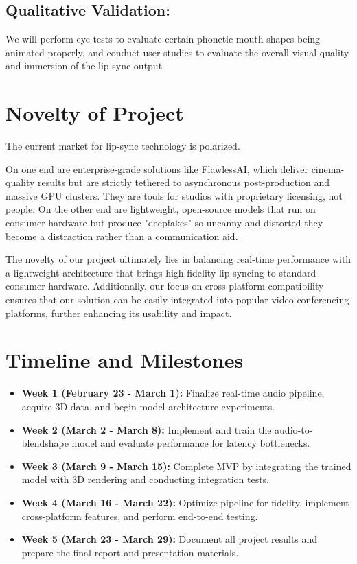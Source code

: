 \subsection{Qualitative Validation:} We will perform eye tests to evaluate certain phonetic mouth shapes being animated properly, and conduct user studies to evaluate the overall visual quality and immersion of the lip-sync output. 

\section{Novelty of Project}

The current market for lip-sync technology is polarized. 

On one end are enterprise-grade solutions like FlawlessAI, which deliver cinema-quality results but are strictly tethered to asynchronous post-production and massive GPU clusters. They are tools for studios with proprietary licensing, not people. On the other end are lightweight, open-source models that run on consumer hardware but produce "deepfakes" so uncanny and distorted they become a distraction rather than a communication aid.

The novelty of our project ultimately lies in balancing real-time performance with a lightweight architecture that brings high-fidelity lip-syncing to standard consumer hardware. Additionally, our focus on cross-platform compatibility ensures that our solution can be easily integrated into popular video conferencing platforms, further enhancing its usability and impact.

\section{Timeline and Milestones}

\begin{itemize}
    \item \textbf{Week 1 (February 23 - March 1):} Finalize real-time audio pipeline, acquire 3D data, and begin model architecture experiments.
    \item \textbf{Week 2 (March 2 - March 8):} Implement and train the audio-to-blendshape model and evaluate performance for latency bottlenecks.
    \item \textbf{Week 3 (March 9 - March 15):} Complete MVP by integrating the trained model with 3D rendering and conducting integration tests.
    \item \textbf{Week 4 (March 16 - March 22):} Optimize pipeline for fidelity, implement cross-platform features, and perform end-to-end testing.
    \item \textbf{Week 5 (March 23 - March 29):} Document all project results and prepare the final report and presentation materials.
\end{itemize}